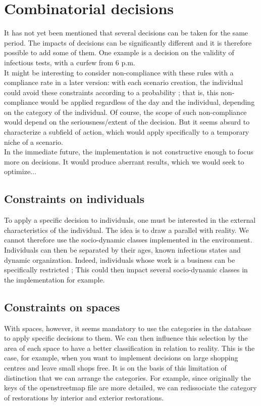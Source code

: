 \chapter{Combinatorial decisions}

It has not yet been mentioned that several decisions can be taken for the same period. The impacts of decisions can be significantly different and it is therefore possible to add some of them. One example is a decision on the validity of infectious tests, with a curfew from 6 p.m.\\

It might be interesting to consider non-compliance with these rules with a compliance rate in a later version: with each scenario creation, the individual could avoid these constraints according to a probability ; that is, this non- compliance would be applied regardless of the day and the individual, depending on the category of the individual. Of course, the scope of such non-compliance would depend on the seriousness/extent of the decision. But it seems absurd to characterize a subfield of action, which would apply specifically to a temporary niche of a scenario.\\

In the immediate future, the implementation is not constructive enough to focus more on decisions. It would produce aberrant results, which we would seek to optimize...\\

\section{Constraints on individuals}

To apply a specific decision to individuals, one must be interested in the external characteristics of the individual. The idea is to draw a parallel with reality. We cannot therefore use the socio-dynamic classes implemented in the environment. Individuals can then be separated by their ages, known infectious states and dynamic organization. Indeed, individuals whose work is a business can be specifically restricted ; This could then impact several socio-dynamic classes in the implementation for example.\\

\section{Constraints on spaces}

With spaces, however, it seems mandatory to use the categories in the database to apply specific decisions to them. We can then influence this selection by the area of each space to have a better classification in relation to reality. This is the case, for example, when you want to implement decisions on large shopping centres and leave small shops free. It is on the basis of this limitation of distinction that we can arrange the categories. For example, since originally the keys of the openstreetmap file are more detailed, we can redissociate the category of restorations by interior and exterior restorations.\\

